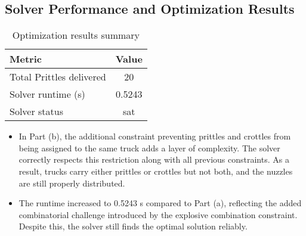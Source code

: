 \documentclass{article}
\begin{document}
\subsection{Solver Performance and Optimization Results}

\begin{table}[h!]
\centering
\caption{Optimization results summary}
\begin{tabular}{l c}
\toprule
Metric & Value \\
\midrule
Total Prittles delivered & 20 \\
Solver runtime (s) & 0.5243 \\
Solver status & sat \\
\bottomrule
\end{tabular}
\end{table}

\begin{itemize}
    \item   
    In Part (b), the additional constraint preventing prittles and crottles from being assigned to the same truck adds a layer of complexity. The solver correctly respects this restriction along with all previous constraints. As a result, trucks carry either prittles or crottles but not both, and the nuzzles are still properly distributed.
    
    \item   
    The runtime increased to 0.5243 s compared to Part (a), reflecting the added combinatorial challenge introduced by the explosive combination constraint. Despite this, the solver still finds the optimal solution reliably.
\end{itemize}
\end{document}
